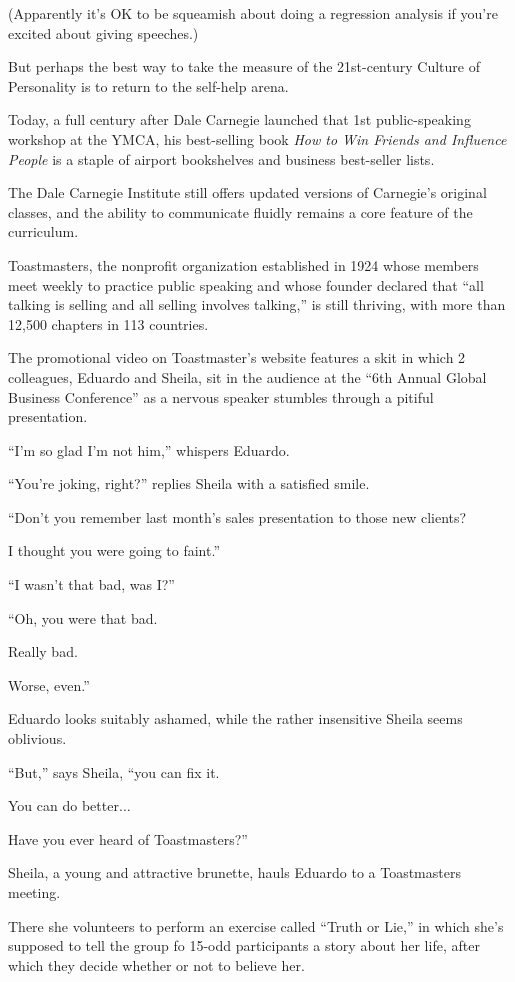 \documentclass[oneside]{article}
\numberwithin{equation}{section}
\begin{document}
(Apparently it's OK to be squeamish about doing a regression analysis if you're excited about giving speeches.)

%
But perhaps the best way to take the measure of the 21st-century Culture of Personality is to return to the self-help arena.

Today, a full century after Dale Carnegie launched that 1st public-speaking workshop at the YMCA, his best-selling book \textit{How to Win Friends and Influence People} is a staple of airport bookshelves and business best-seller lists.

The Dale Carnegie Institute still offers updated versions of Carnegie's original classes, and the ability to communicate fluidly remains a core feature of the curriculum.

Toastmasters, the nonprofit organization established in 1924 whose members meet weekly to practice public speaking and whose founder declared that ``all talking is selling and all selling involves talking,'' is still thriving, with more than 12,500 chapters in 113 countries.

%
The promotional video on Toastmaster's website features a skit in which 2 colleagues, Eduardo and Sheila, sit in the audience at the ``6th Annual Global Business Conference'' as a nervous speaker stumbles through a pitiful presentation.

%
``I'm so glad I'm not him,'' whispers Eduardo.

``You're joking, right?'' replies Sheila with a satisfied smile.

``Don't you remember last month's sales presentation to those new clients?

I thought you were going to faint.''

%
``I wasn't that bad, was I?''

%
``Oh, you were that bad.

Really bad.

Worse, even.''

%
Eduardo looks suitably ashamed, while the rather insensitive Sheila seems oblivious.

%
``But,'' says Sheila, ``you can fix it.

You can do better$\ldots$

Have you ever heard of Toastmasters?''

%
Sheila, a young and attractive brunette, hauls Eduardo to a Toastmasters meeting.

There she volunteers to perform an exercise called ``Truth or Lie,'' in which she's supposed to tell the group fo 15-odd participants a story about her life, after which they decide whether or not to believe her.
\end{document}
